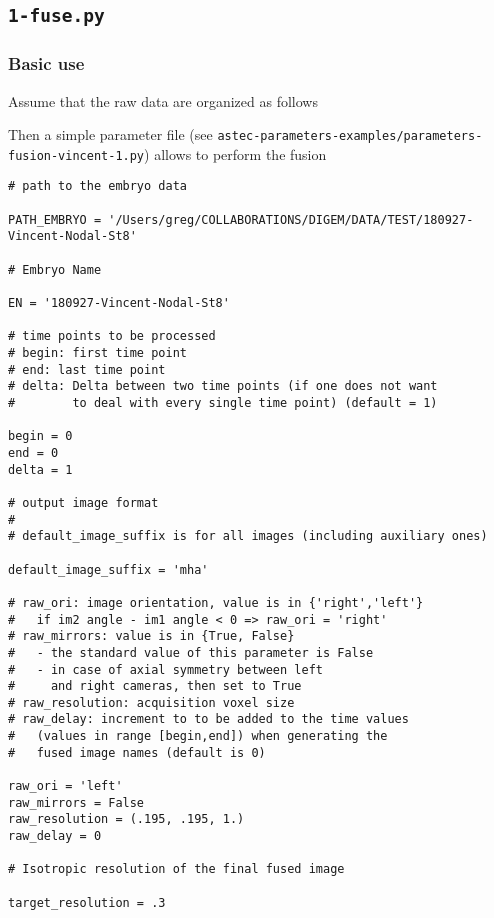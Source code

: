 \subsection{\texttt{1-fuse.py}}

\subsubsection{Basic use}
\label{sec:cli:fuse:basic:use}
Assume that the raw data are organized as follows

Then a simple parameter file (see \texttt{astec-parameters-examples/parameters-fusion-vincent-1.py}) allows to perform the fusion
\begin{verbatim}
# path to the embryo data

PATH_EMBRYO = '/Users/greg/COLLABORATIONS/DIGEM/DATA/TEST/180927-Vincent-Nodal-St8'

# Embryo Name

EN = '180927-Vincent-Nodal-St8'

# time points to be processed
# begin: first time point
# end: last time point
# delta: Delta between two time points (if one does not want
#        to deal with every single time point) (default = 1)

begin = 0
end = 0
delta = 1

# output image format
#
# default_image_suffix is for all images (including auxiliary ones)

default_image_suffix = 'mha'

# raw_ori: image orientation, value is in {'right','left'}
#   if im2 angle - im1 angle < 0 => raw_ori = 'right'
# raw_mirrors: value is in {True, False}
# 	- the standard value of this parameter is False
# 	- in case of axial symmetry between left
# 	  and right cameras, then set to True
# raw_resolution: acquisition voxel size
# raw_delay: increment to to be added to the time values
#   (values in range [begin,end]) when generating the
#   fused image names (default is 0)

raw_ori = 'left'
raw_mirrors = False
raw_resolution = (.195, .195, 1.)
raw_delay = 0

# Isotropic resolution of the final fused image

target_resolution = .3
\end{verbatim}

